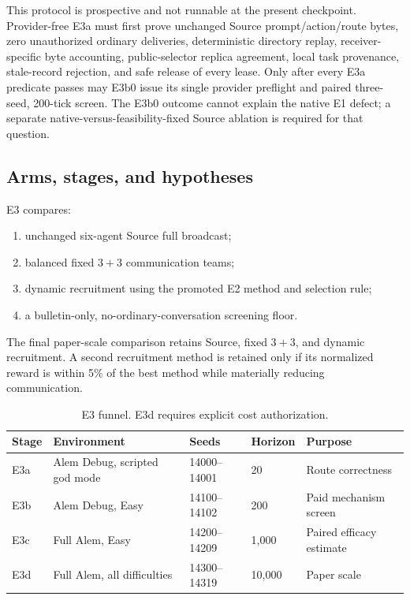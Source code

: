 \documentclass[11pt]{article}
\begin{document}
This protocol is prospective and not runnable at the present checkpoint.
Provider-free E3a must first prove unchanged Source prompt/action/route bytes,
zero unauthorized ordinary deliveries, deterministic directory replay,
receiver-specific byte accounting, public-selector replica agreement, local
task provenance, stale-record rejection, and safe release of every lease.
Only after every E3a predicate passes may E3b0 issue its single provider
preflight and paired three-seed, 200-tick screen.  The E3b0 outcome cannot
explain the native E1 defect; a separate native-versus-feasibility-fixed Source
ablation is required for that question.

\subsection{Arms, stages, and hypotheses}

E3 compares:

\begin{enumerate}
  \item unchanged six-agent Source full broadcast;
  \item balanced fixed $3+3$ communication teams;
  \item dynamic recruitment using the promoted E2 method and selection rule;
  \item a bulletin-only, no-ordinary-conversation screening floor.
\end{enumerate}

The final paper-scale comparison retains Source, fixed $3+3$, and dynamic
recruitment.  A second recruitment method is retained only if its normalized
reward is within 5\% of the best method while materially reducing
communication.

\begin{table}[ht]
\centering
\small
\begin{tabular}{@{}lllll@{}}
\toprule
Stage & Environment & Seeds & Horizon & Purpose\\
\midrule
E3a & Alem Debug, scripted god mode & 14000--14001 & 20 & Route correctness\\
E3b & Alem Debug, Easy & 14100--14102 & 200 & Paid mechanism screen\\
E3c & Full Alem, Easy & 14200--14209 & 1,000 & Paired efficacy estimate\\
E3d & Full Alem, all difficulties & 14300--14319 & 10,000 & Paper scale\\
\bottomrule
\end{tabular}
\caption{E3 funnel.  E3d requires explicit cost authorization.}
\label{tab:e3-design}
\end{table}
\end{document}

